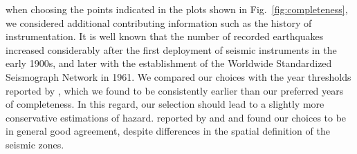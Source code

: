  when choosing the points indicated in the plots shown in Fig.~\ref{fig:completeness}, we considered additional contributing information such as the history of instrumentation. It is well known that the number of recorded earthquakes increased considerably after the first deployment of seismic instruments in the early 1900s, and later with the establishment of the Worldwide Standardized Seismograph Network in 1961. We compared our choices with the year thresholds reported by \citet{Zare2014}, which we found to be consistently earlier than our preferred years of completeness. In this regard, our selection should lead to a slightly more conservative estimations of hazard.  reported by \citet{Karimiparidari2013} and \citet{Khodaverdian_2016_BSSA} and found our choices to be in general good agreement, despite differences in the spatial definition of the seismic zones.

